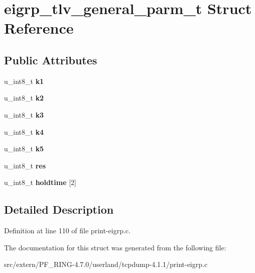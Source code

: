 \hypertarget{structeigrp__tlv__general__parm__t}{
\section{eigrp\_\-tlv\_\-general\_\-parm\_\-t Struct Reference}
\label{structeigrp__tlv__general__parm__t}
}
\subsection*{Public Attributes}
\begin{DoxyCompactItemize}
\item 
\hypertarget{structeigrp__tlv__general__parm__t_ab959dcab1894b38ab213cfa70ed30df8}{
u\_\-int8\_\-t {\bfseries k1}}
\label{structeigrp__tlv__general__parm__t_ab959dcab1894b38ab213cfa70ed30df8}

\item 
\hypertarget{structeigrp__tlv__general__parm__t_ae881efafa3d32095264c646ef2a4e1c9}{
u\_\-int8\_\-t {\bfseries k2}}
\label{structeigrp__tlv__general__parm__t_ae881efafa3d32095264c646ef2a4e1c9}

\item 
\hypertarget{structeigrp__tlv__general__parm__t_a61517a2e4eab7aede1852f810f730ee6}{
u\_\-int8\_\-t {\bfseries k3}}
\label{structeigrp__tlv__general__parm__t_a61517a2e4eab7aede1852f810f730ee6}

\item 
\hypertarget{structeigrp__tlv__general__parm__t_a001bc5e5d7011feb41010c3008b1b7ea}{
u\_\-int8\_\-t {\bfseries k4}}
\label{structeigrp__tlv__general__parm__t_a001bc5e5d7011feb41010c3008b1b7ea}

\item 
\hypertarget{structeigrp__tlv__general__parm__t_aa96107d279f964fd00bab6a3c8b7c289}{
u\_\-int8\_\-t {\bfseries k5}}
\label{structeigrp__tlv__general__parm__t_aa96107d279f964fd00bab6a3c8b7c289}

\item 
\hypertarget{structeigrp__tlv__general__parm__t_a1c4b8c992cb8d88da0adfa906260d9a5}{
u\_\-int8\_\-t {\bfseries res}}
\label{structeigrp__tlv__general__parm__t_a1c4b8c992cb8d88da0adfa906260d9a5}

\item 
\hypertarget{structeigrp__tlv__general__parm__t_ae3547c3074096e2a1fad530d4655fb69}{
u\_\-int8\_\-t {\bfseries holdtime} \mbox{[}2\mbox{]}}
\label{structeigrp__tlv__general__parm__t_ae3547c3074096e2a1fad530d4655fb69}

\end{DoxyCompactItemize}


\subsection{Detailed Description}


Definition at line 110 of file print-\/eigrp.c.



The documentation for this struct was generated from the following file:\begin{DoxyCompactItemize}
\item 
src/extern/PF\_\-RING-\/4.7.0/userland/tcpdump-\/4.1.1/print-\/eigrp.c\end{DoxyCompactItemize}
